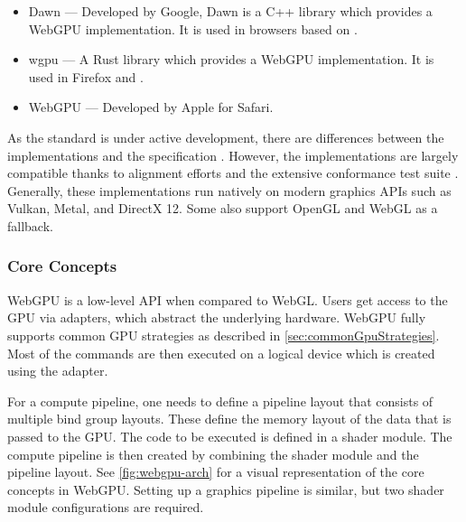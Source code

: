 \begin{itemize}
  \item{\gls{Dawn}} \cite{dawnImplementation} — Developed by Google, \gls{Dawn} is a C++ library which provides a \gls{WebGPU} implementation. It is used in browsers based on .
  \item{\gls{wgpu}} \cite{wgpuImplementation} — A Rust library which provides a \gls{WebGPU} implementation. It is used in Firefox and .
  \item{ \gls{WebGPU}} \cite{webKitWebGPUImplementation} — Developed by Apple for Safari.
\end{itemize}

As the standard is under active development, there are differences between the implementations and the specification \cite{wgpuStandardDeviation}. However, the implementations are largely compatible thanks to alignment efforts and the extensive conformance test suite \cite{WebGPUConformanceTestSuite}. Generally, these implementations run natively on modern graphics \glspl{API} such as \gls{Vulkan}, \gls{Metal}, and \gls{DirectX 12}. Some also support \gls{OpenGL} and \gls{WebGL} as a fallback.

\subsubsection{Core Concepts}

\gls{WebGPU} is a low-level \gls{API} when compared to \gls{WebGL}. Users get access to the \gls{GPU} via adapters, which abstract the underlying hardware. \gls{WebGPU} fully supports common \gls{GPU} strategies as described in \autoref{sec:commonGpuStrategies}. Most of the commands are then executed on a logical device which is created using the adapter.

For a compute pipeline, one needs to define a pipeline layout that consists of multiple bind group layouts. These define the memory layout of the data that is passed to the \gls{GPU}. The code to be executed is defined in a shader module. The compute pipeline is then created by combining the shader module and the pipeline layout. See \autoref{fig:webgpu-arch} for a visual representation of the core concepts in \gls{WebGPU}. Setting up a graphics pipeline is similar, but two shader module configurations are required.

